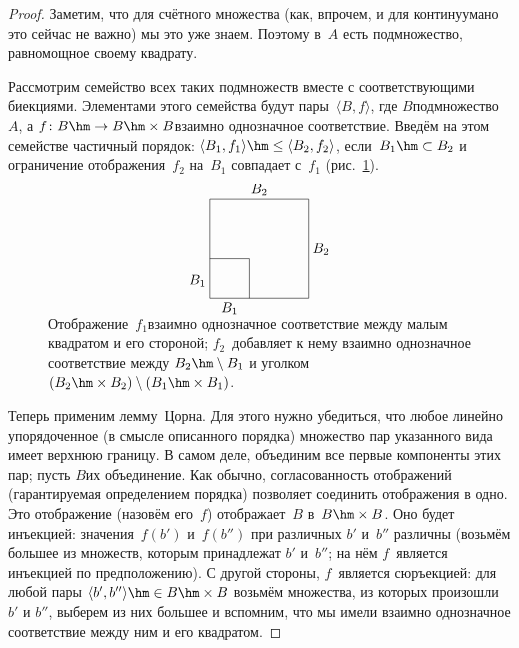 \begin{proof}
Заметим, что для счётного множества (как, впрочем, и для
континуума\т но это сейчас не важно) мы это уже знаем.
Поэтому в~$A$ есть подмножество, равномощное своему
квадрату.

Рассмотрим семейство всех таких подмножеств вместе с
соответствующими биекциями. Элементами этого семейства будут
пары~$\langle B, f\rangle$, где $B$\т подмножество~$A$, а
$f\colon B\hm\to B\hm\times B$\т взаимно однозначное соответствие. Введём на
этом семействе частичный порядок: $\langle B_1, f_1\rangle\hm\le
\langle B_2,f_2\rangle$, если~$B_1 \hm\subset B_2$ и ограничение
отображения~$f_2$ на~$B_1$ совпадает с~$f_1$ (рис.~\ref{card-1}).

\begin{figure}[ht]
        $$
\unitlength=0.5mm
\begin{picture}(50,55)
\put(0,0){\line(1,0){50}}
\put(0,50){\line(1,0){50}}
\put(0,0){\line(0,1){50}}
\put(50,0){\line(0,1){50}}
\put(20,0){\line(0,1){20}}
\put(0,20){\line(1,0){20}}
\put(10,-7){\hbox to 0pt{\hss $B_1$\hss}}
\put(25,53){\hbox to 0pt{\hss $B_2$\hss}}
\put(-2,7){\hbox to 0pt{\hss $B_1$}}
\put(52,23){\hbox to 0pt{$B_2$\hss}}
\end{picture}
        $$
\caption{
Отображение~$f_1$\т взаимно однозначное соответствие
между малым квадратом и его стороной; $f_2$~добавляет к нему
взаимно однозначное соответствие между $B_2\hm\setminus B_1$ и
 уголком\ $(B_2\hm\times B_2)\setminus(B_1\hm\times B_1)$.
        }
\label{card-1}
\end{figure}

Теперь применим лемму~Цорна. Для этого нужно убедиться, что любое
линейно упорядоченное (в смысле описанного порядка) множество
пар указанного вида имеет верхнюю границу. В самом деле,
объединим все первые компоненты
этих пар; пусть $B$\т их
объединение. Как обычно, согласованность отображений
(гарантируемая определением порядка) позволяет соединить
отображения в одно. Это отображение (назовём его~$f$) отображает~$B$
в~$B\hm\times B$. Оно будет инъекцией: значения~$f(b')$ и~$f(b'')$
при различных $b'$ и~$b''$ различны (возьмём большее
из множеств, которым принадлежат $b'$ и~$b''$; на нём $f$~является
инъекцией по предположению). С другой стороны, $f$~является
сюръекцией: для любой пары $\langle b',b''\rangle\hm\in B\hm\times B$
возьмём множества, из которых произошли $b'$ и $b''$, выберем
из них большее и вспомним, что мы имели взаимно однозначное
соответствие между ним и его квадратом.


\end{proof}
